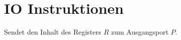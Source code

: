 \section{IO Instruktionen}
\label{sec:IO-Instruktionen}




Sendet den Inhalt des Registers $R$ zum Ausgangsport $P$.









